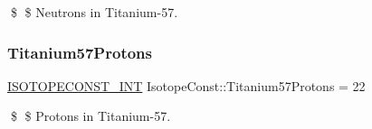 \$ \$ Neutrons in Titanium-\/57. \mbox{\label{group___isotope_const-_titanium-_ti57_ga0043320b09d2a7ccc7a0275f7052da9a}} 
\subsubsection{\texorpdfstring{Titanium57\+Protons}{Titanium57Protons}}
{\footnotesize\ttfamily \mbox{\hyperlink{group___isotope_const-_macros_ga5f18360b3e99483a35c32d789e62621c}{I\+S\+O\+T\+O\+P\+E\+C\+O\+N\+S\+T\+\_\+\+I\+NT}} Isotope\+Const\+::\+Titanium57\+Protons = 22}

\$ \$ Protons in Titanium-\/57. 